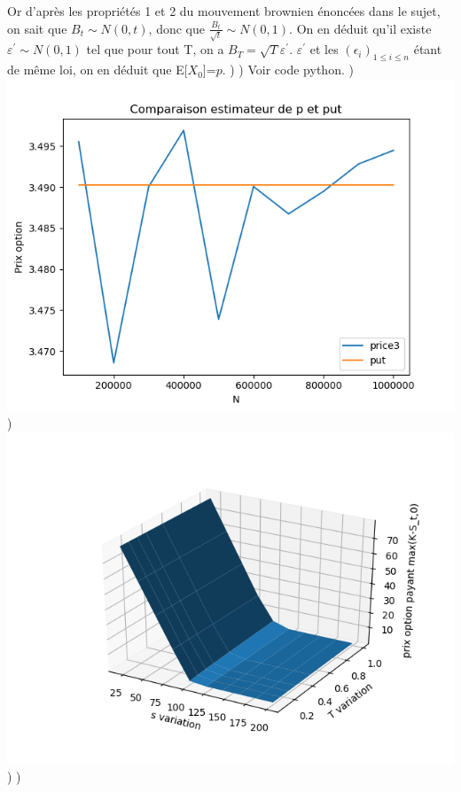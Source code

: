 \documentclass{exam}
\begin{document}
Or d'après les propriétés 1 et 2 du mouvement brownien énoncées dans le sujet, on sait que $B_t \sim N(0,t)$, donc que $\frac{B_t}{\sqrt{t}} \sim N(0,1)$. On en déduit qu'il existe $\varepsilon^{'} \sim N(0,1)$ tel que pour tout T, on a $B_T = \sqrt{T}\varepsilon^{'}$. $\varepsilon^{'}$ et les $(\epsilon_i)_{1 \leq i \leq n}$ étant de même loi, on en déduit que  E[$X_0$]=$p$.
\newline
{})
\newline
{}) Voir code python.
\newline
{}) \includegraphics{question17.png}
\newline
{}) \includegraphics{question18.png}
\newline
{})
\newline
{})
\end{document}
